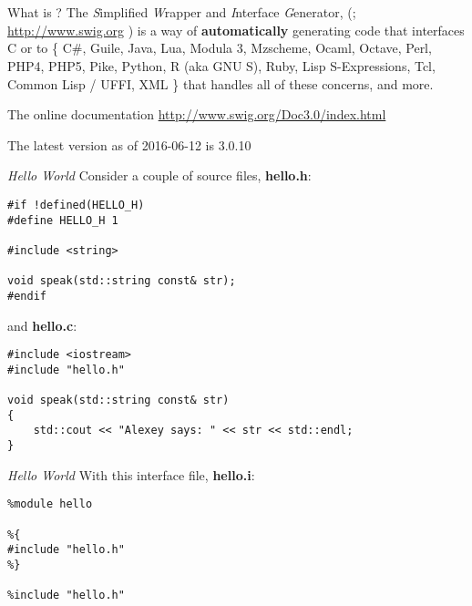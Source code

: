 \documentclass[10pt, t]{beamer}
\let\texttt=\graytt
\let\alert=\textbf
\newcommand{\swig}{\texttt{swig}\xspace}  %
\begin{document}
\section*{\protect\swig}
\label{sec-6}
\begin{frame}[label=sec-6-1]{What is \swig?}
The \textit{S}implified \textit{W}rapper and \textit{I}nterface \textit{G}enerator,
(\swig;
\url{http://www.swig.org}
) is a way of \alert{automatically} generating code that interfaces C or \CPP to \{
C\#,
Guile,
Java,
Lua,
Modula 3,
Mzscheme,
Ocaml,
Octave,
Perl,
PHP4,
PHP5,
Pike,
Python,
R (aka GNU S),
Ruby,
Lisp S-Expressions,
Tcl,
Common Lisp / UFFI,
XML
\}
that handles all of these concerns, and more.

\begin{block}{The \swig online documentation}
\url{http://www.swig.org/Doc3.0/index.html}

The latest version as of 2016-06-12 is 3.0.10
\end{block}
\end{frame}

\begin{frame}[fragile,label=sec-6-2]{\emph{Hello World}}
 Consider a couple of source files, \alert{hello.h}:
\lstset{language=c++,label= ,caption= ,numbers=none}
\begin{lstlisting}
#if !defined(HELLO_H)
#define HELLO_H 1

#include <string>

void speak(std::string const& str);
#endif
\end{lstlisting}
and \alert{hello.c}:
\lstset{language=c++,label= ,caption= ,numbers=none}
\begin{lstlisting}
#include <iostream>
#include "hello.h"

void speak(std::string const& str)
{
    std::cout << "Alexey says: " << str << std::endl;
}
\end{lstlisting}
\end{frame}

\begin{frame}[fragile,label=sec-6-3]{\emph{Hello World}}
 With this \swig interface file, \alert{hello.i}:
\lstset{language=C,label= ,caption= ,numbers=none}
\begin{lstlisting}
%module hello

%{
#include "hello.h"
%}

%include "hello.h"
\end{lstlisting}
\end{frame}
\end{document}
